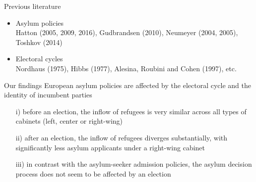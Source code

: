 \documentclass{beamer}
\begin{document}
	\begin{frame}{Previous literature}
\begin{itemize}
\item{Asylum policies}\\[1ex]
Hatton (2005, 2009, 2016), Gudbrandsen (2010), Neumeyer (2004, 2005), Toshkov (2014)\\[3ex]

\item{Electoral cycles}\\[1ex]
Nordhaus (1975), Hibbs (1977), Alesina, Roubini and Cohen (1997), etc.\\[3ex]
\end{itemize}
	\end{frame}

    \begin{frame}{Our findings}
European asylum policies are affected by the electoral cycle and the identity of incumbent parties\\[2ex]
\begin{itemize}
\item[i)]{before an election, the inflow of refugees is very similar across all types of cabinets (left, center or right-wing)}\\[1ex]
\item[ii)]{after an election, the inflow
of refugees diverges substantially, with significantly less asylum applicants under a right-wing cabinet}\\[1ex]
\item[iii)]{in contrast with the asylum-seeker admission policies, the asylum
decision process does not seem to be affected by an election}
\end{itemize}
	\end{frame}




\end{document}
